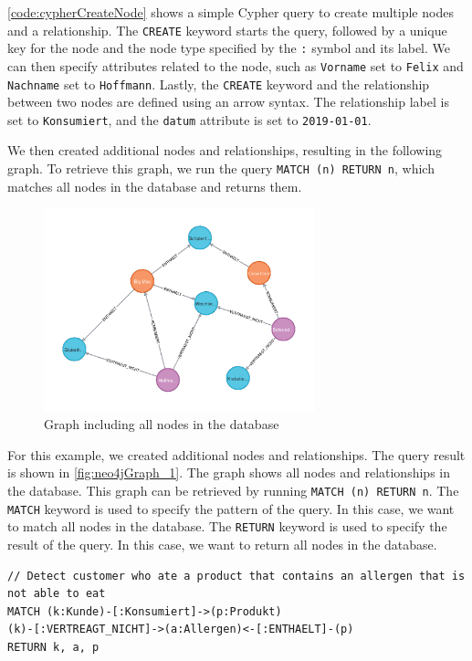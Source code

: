 \autoref{code:cypherCreateNode} shows a simple Cypher query to create multiple nodes and a relationship. The \texttt{CREATE} keyword starts the query, followed by a unique key for the node and the node type specified by the \texttt{:} symbol and its label. We can then specify attributes related to the node, such as \texttt{Vorname} set to \texttt{Felix} and \texttt{Nachname} set to \texttt{Hoffmann}. Lastly, the \texttt{CREATE} keyword and the relationship between two nodes are defined using an arrow syntax. The relationship label is set to \texttt{Konsumiert}, and the \texttt{datum} attribute is set to \texttt{2019-01-01}.

We then created additional nodes and relationships, resulting in the following graph. To retrieve this graph, we run the query \texttt{MATCH (n) RETURN n}, which matches all nodes in the database and returns them.

\begin{figure}[H]
    \centering
    \caption{Graph including all nodes in the database} \label{fig:neo4jGraph_1}
    \includegraphics[width=0.7\textwidth]{images/neo4j_example_graph_1.png}
\end{figure}

For this example, we created additional nodes and relationships. The query result is shown in \autoref{fig:neo4jGraph_1}. The graph shows all nodes and relationships in the database. This graph can be retrieved by running \texttt{MATCH (n) RETURN n}. The \texttt{MATCH} keyword is used to specify the pattern of the query. In this case, we want to match all nodes in the database. The \texttt{RETURN} keyword is used to specify the result of the query. In this case, we want to return all nodes in the database.

\begin{code}[H]
    \caption{Cypher Query to select allergic reactions} \label{code:cypherFindAllergicReactions}
    \begin{verbatim}
// Detect customer who ate a product that contains an allergen that is not able to eat
MATCH (k:Kunde)-[:Konsumiert]->(p:Produkt)
(k)-[:VERTREAGT_NICHT]->(a:Allergen)<-[:ENTHAELT]-(p)
RETURN k, a, p
    \end{verbatim}
\end{code}

